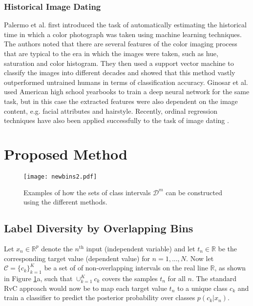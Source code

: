 \documentclass[10pt, conference, a4paper]{IEEEtran}
\begin{document}
\subsubsection{Historical Image Dating}
Palermo et al. \cite{DBLP:conf/eccv/PalermoHE12} first introduced the task of automatically estimating the historical time in which a color photograph was taken using machine learning techniques. The authors noted that there are several features of the color imaging process that are typical to the era in which the images were taken, such as hue, saturation and color histogram. They then used a support vector machine to classify the images into different decades and showed that this method vastly outperformed untrained humans in terms of classification accuracy. Ginosar et al. \cite{ginosar2015century} used American high school yearbooks to train a deep neural network for the same task, but in this case the extracted features were also dependent on the image content, e.g. facial attributes and hairstyle. Recently, ordinal regression techniques have also been applied successfully to the task of image dating \cite{liu2017deep, belharbi2019deep}. 

\section{Proposed Method}

\begin{figure}[t]
  \centering
  
  

  
  \texttt{[image: newbins2.pdf]}
  \caption{Examples of how the sets of class intervals $\mathcal{D}^m$ can be constructed using the different methods.}
 \label{classes_fig}
\end{figure}

\subsection{Label Diversity by Overlapping Bins}
Let $x_n \in \mathbb{R}^p$ denote the $n^\text{th}$ input (independent variable) and let $t_n \in \mathbb{R}$ be the corresponding target value (dependent value) for $n = 1, ..., N$. Now let $\mathcal{C} = \{c_k\}_{k=1}^{K}$ be a set of of non-overlapping intervals on the real line $\mathbb{R}$, as shown in Figure \ref{classes_fig}a, such that $\cup_{k=1}^{K} c_k$ covers the samples $t_n$ for all $n$. The standard RvC approach would now be to map each target value $t_n$ to a unique class $c_k$ and train a classifier to predict the posterior probability over classes $p(c_k | x_n)$.
\end{document}
